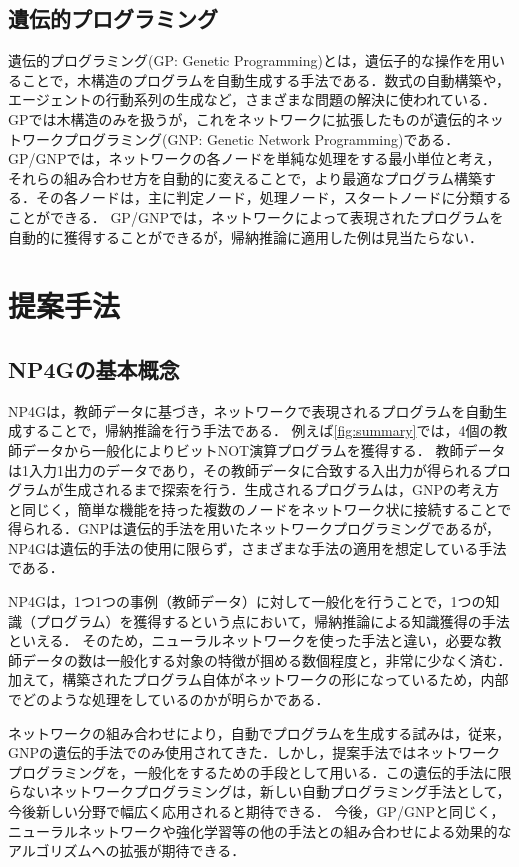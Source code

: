 \documentclass[exploratorypaper]{jsaiart} %
\begin{document}
\subsection{遺伝的プログラミング}
遺伝的プログラミング(GP: Genetic Programming)とは，遺伝子的な操作を用いることで，木構造のプログラムを自動生成する手法である\cite{Koza1994}．数式の自動構築や，エージェントの行動系列の生成など，さまざまな問題の解決に使われている．GPでは木構造のみを扱うが，これをネットワークに拡張したものが遺伝的ネットワークプログラミング(GNP: Genetic Network Programming)である\cite{gnp}．
GP/GNPでは，ネットワークの各ノードを単純な処理をする最小単位と考え，それらの組み合わせ方を自動的に変えることで，より最適なプログラム構築する．その各ノードは，主に判定ノード，処理ノード，スタートノードに分類することができる．
GP/GNPでは，ネットワークによって表現されたプログラムを自動的に獲得することができるが，帰納推論に適用した例は見当たらない．

\section{提案手法}
\subsection{NP4Gの基本概念}
NP4Gは，教師データに基づき，ネットワークで表現されるプログラムを自動生成することで，帰納推論を行う手法である．
例えば\ref{fig:summary}では，4個の教師データから一般化によりビットNOT演算プログラムを獲得する．
教師データは1入力1出力のデータであり，その教師データに合致する入出力が得られるプログラムが生成されるまで探索を行う．生成されるプログラムは，GNPの考え方と同じく，簡単な機能を持った複数のノードをネットワーク状に接続することで得られる．GNPは遺伝的手法を用いたネットワークプログラミングであるが，NP4Gは遺伝的手法の使用に限らず，さまざまな手法の適用を想定している手法である．

NP4Gは，1つ1つの事例（教師データ）に対して一般化を行うことで，1つの知識（プログラム）を獲得するという点において，帰納推論による知識獲得の手法といえる．
そのため，ニューラルネットワークを使った手法と違い，必要な教師データの数は一般化する対象の特徴が掴める数個程度と，非常に少なく済む．加えて，構築されたプログラム自体がネットワークの形になっているため，内部でどのような処理をしているのかが明らかである．

ネットワークの組み合わせにより，自動でプログラムを生成する試みは，従来，GNPの遺伝的手法でのみ使用されてきた．しかし，提案手法ではネットワークプログラミングを，一般化をするための手段として用いる．この遺伝的手法に限らないネットワークプログラミングは，新しい自動プログラミング手法として，今後新しい分野で幅広く応用されると期待できる．
今後，GP/GNPと同じく，ニューラルネットワークや強化学習等の他の手法との組み合わせによる効果的なアルゴリズムへの拡張が期待できる．
\end{document}
